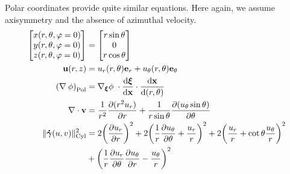 \documentclass[11 pt]{report}
\begin{document}
Polar coordinates provide quite similar equations. Here again, we assume axisymmetry and the absence of azimuthal velocity.
\begin{align}
    \begin{bmatrix}
        x(r, \theta, \varphi=0) \\
        y(r, \theta, \varphi=0) \\
        z(r, \theta, \varphi=0)
    \end{bmatrix} &=
    \begin{bmatrix}
        r \sin{\theta} \\
        0\\
        r \cos{\theta} \\
    \end{bmatrix}\\
    \mathbf{u}(r, z) &= u_r(r, \theta) \mathbf{e}_r + u_\theta(r, \theta) \mathbf{e}_\theta\\
    \left(\nabla \: \phi\right)_{\text{Pol}} &= \nabla_{\boldsymbol\xi} \phi \; \cdot \dv{\boldsymbol \xi}{\mathbf{x}} \cdot \dv{\mathbf{x}}{(r, \theta)} \\
    \nabla \cdot \mathbf{v} &= \frac{1}{r^2}\pdv{(r^2 u_r)}{r} + \frac{1}{r\sin\theta} \pdv{(u_\theta \sin \theta)}{\theta}\\
    \|\boldsymbol{\dot \gamma}(u, v)\|_{\text{Cyl}}^2 &= 2 \bigg(\pdv{u_r}{r}\bigg)^2 + 2\bigg(\frac{1}{r}\pdv{u_\theta}{\theta} + \frac{u_r}{r}\bigg)^2 + 2\bigg(\frac{u_r}{r} + \cot \theta \frac{u_\theta}{r}\bigg)^2 \nonumber\\
    &+ \bigg(\frac{1}{r}\pdv{u_r}{\theta} \pdv{u_\theta}{r} - \frac{u_\theta}{r}\bigg)^2
\end{align}

%
\end{document}
